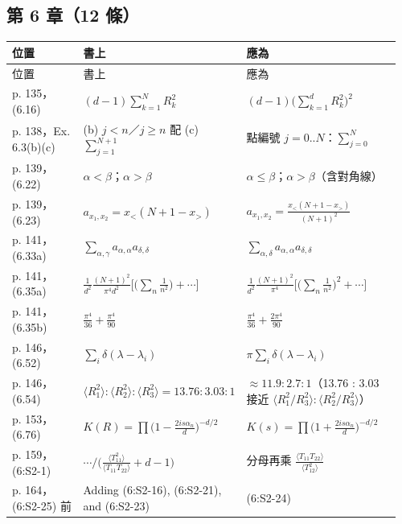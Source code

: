 \subsection{第 6 章（12 條）}
{\footnotesize\renewcommand{\arraystretch}{1.1}\setlength{\tabcolsep}{4pt}
\begin{longtable}{@{}>{\raggedright\arraybackslash}p{0.21\linewidth}>{\raggedright\arraybackslash}p{0.34\linewidth}>{\raggedright\arraybackslash}p{0.41\linewidth}@{}}
\toprule 位置 & 書上 & 應為\\ \midrule\endfirsthead
\toprule 位置 & 書上 & 應為\\ \midrule\endhead
\bottomrule\endfoot
p. 135，(6.16) & $(d-1)\sum_{k=1}^{N}R_k^2$ & $(d-1)\big(\sum_{k=1}^{d}R_k^2\big)^2$\\
p. 138，Ex. 6.3(b)(c) & (b) $j<n$／$j\ge n$ 配 (c) $\sum_{j=1}^{N+1}$ & 點編號 $j=0..N$：$\sum_{j=0}^{N}$\\
p. 139，(6.22) & $\alpha<\beta$；$\alpha>\beta$ & $\alpha\le\beta$；$\alpha>\beta$（含對角線）\\
p. 139，(6.23) & $a_{x_1,x_2}=x_<(N+1-x_>)$ & $a_{x_1,x_2}=\frac{x_<(N+1-x_>)}{(N+1)^2}$\\
p. 141，(6.33a) & $\sum_{\alpha,\gamma}a_{\alpha,\alpha}a_{\delta,\delta}$ & $\sum_{\alpha,\delta}a_{\alpha,\alpha}a_{\delta,\delta}$\\
p. 141，(6.35a) & $\frac{1}{d^2}\frac{(N+1)^2}{\pi^4d^2}\Big[\Big(\sum_n\frac1{n^2}\Big)+\cdots\Big]$ & $\frac{1}{d^2}\frac{(N+1)^2}{\pi^4}\Big[\Big(\sum_n\frac1{n^2}\Big)^2+\cdots\Big]$\\
p. 141，(6.35b) & $\frac{\pi^4}{36}+\frac{\pi^4}{90}$ & $\frac{\pi^4}{36}+\frac{2\pi^4}{90}$\\
p. 146，(6.52) & $\sum_i\delta(\lambda-\lambda_i)$ & $\pi\sum_i\delta(\lambda-\lambda_i)$\\
p. 146，(6.54) & $\langle R_1^2\rangle:\langle R_2^2\rangle:\langle R_3^2\rangle=13.76:3.03:1$ & $\approx11.9:2.7:1$（13.76 : 3.03 接近 $\langle R_1^2/R_3^2\rangle:\langle R_2^2/R_3^2\rangle$）\\
p. 153，(6.76) & $K(R)=\prod\big(1-\frac{2is\alpha_n}{d}\big)^{-d/2}$ & $K(s)=\prod\big(1+\frac{2is\alpha_n}{d}\big)^{-d/2}$\\
p. 159，(6:S2-1) & $\cdots\Big/\Big(\frac{\langle T_{11}^2\rangle}{\langle T_{11}T_{22}\rangle}+d-1\Big)$ & 分母再乘 $\frac{\langle T_{11}T_{22}\rangle}{\langle T_{12}^2\rangle}$\\
p. 164，(6:S2-25) 前 & Adding (6:S2-16), (6:S2-21), and (6:S2-23) & (6:S2-24)\\
\end{longtable}}

